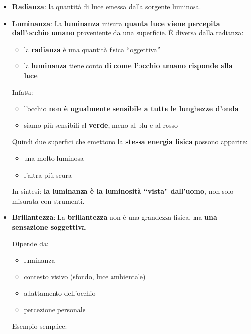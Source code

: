 \documentclass[
]{article}
\providecommand{\tightlist}{%
  \setlength{\itemsep}{0pt}\setlength{\parskip}{0pt}}
\begin{document}
\begin{itemize}
\item
  \textbf{Radianza}: la quantità di luce emessa dalla sorgente luminosa.
\item
  \textbf{Luminanza}: La \textbf{luminanza} misura \textbf{quanta luce viene percepita dall'occhio umano} proveniente da una superficie.
  È diversa dalla radianza:

  \begin{itemize}
  \tightlist
  \item
    la \textbf{radianza} è una quantità fisica ``oggettiva''
  \item
    la \textbf{luminanza} tiene conto \textbf{di come l'occhio umano risponde alla luce}
  \end{itemize}

  Infatti:

  \begin{itemize}
  \tightlist
  \item
    l'occhio \textbf{non è ugualmente sensibile a tutte le lunghezze d'onda}
  \item
    siamo più sensibili al \textbf{verde}, meno al blu e al rosso
  \end{itemize}

  Quindi due superfici che emettono la \textbf{stessa energia fisica} possono apparire:

  \begin{itemize}
  \tightlist
  \item
    una molto luminosa
  \item
    l'altra più scura
  \end{itemize}

  In sintesi: \textbf{la luminanza è la luminosità ``vista'' dall'uomo}, non solo misurata con strumenti.
\item
  \textbf{Brillantezza}: La \textbf{brillantezza} non è una grandezza fisica, ma \textbf{una sensazione soggettiva}.

  Dipende da:

  \begin{itemize}
  \tightlist
  \item
    luminanza
  \item
    contesto visivo (sfondo, luce ambientale)
  \item
    adattamento dell'occhio
  \item
    percezione personale
  \end{itemize}

  Esempio semplice:


\end{itemize}
\end{document}

